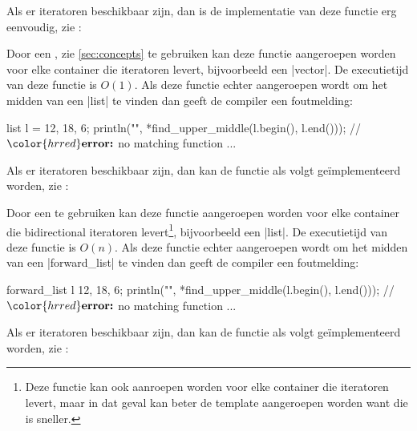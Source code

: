 \begin{cpplstShortInline}
Als er  iteratoren beschikbaar zijn, dan is de implementatie van deze functie erg eenvoudig, zie :


Door een , zie \cref{sec:concepts} te gebruiken kan deze functie aangeroepen worden voor elke container die  iteratoren levert, bijvoorbeeld een |vector|.
De executietijd van deze functie is $O(1)$.
Als deze functie echter aangeroepen wordt om het midden van een |list| te vinden dan geeft de compiler een foutmelding:

\begin{cpplstfragment}[mathescape=true]
list l = {12, 18, 6};
println("{}", *find_upper_middle(l.begin(), l.end())); // $\color{hrred}\textbf{error:}$ no matching function ...
\end{cpplstfragment}

Als er  iteratoren beschikbaar zijn, dan kan de functie als volgt geïmplementeerd worden, zie :


Door een  te gebruiken kan deze functie aangeroepen worden voor elke container die bidirectional iteratoren levert\footnote{%
	Deze functie kan ook aanroepen worden voor elke container die  iteratoren levert, maar in dat geval kan beter de template  aangeroepen worden want die is sneller.
}, bijvoorbeeld een |list|.
De executietijd van deze functie is $O(n)$.
Als deze functie echter aangeroepen wordt om het midden van een |forward_list| te vinden dan geeft de compiler een foutmelding:

\begin{cpplstfragment}[mathescape=true]
forward_list l {12, 18, 6};
println("{}", *find_upper_middle(l.begin(), l.end())); // $\color{hrred}\textbf{error:}$ no matching function ...
\end{cpplstfragment}

Als er  iteratoren beschikbaar zijn, dan kan de functie als volgt geïmplementeerd worden, zie :



\end{cpplstShortInline}
